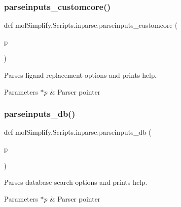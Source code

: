\subsubsection{\texorpdfstring{parseinputs\+\_\+customcore()}{parseinputs\_customcore()}}
{\footnotesize\ttfamily def mol\+Simplify.\+Scripts.\+inparse.\+parseinputs\+\_\+customcore (\begin{DoxyParamCaption}\item[{}]{p }\end{DoxyParamCaption})}



Parses ligand replacement options and prints help. 


\begin{DoxyParams}{Parameters}
{\em $\ast$p} & Parser pointer \\
\hline
\end{DoxyParams}
\mbox{\label{namespacemolSimplify_1_1Scripts_1_1inparse_a515dd3cb4232166cebbe466bf42ad916}} 
\subsubsection{\texorpdfstring{parseinputs\+\_\+db()}{parseinputs\_db()}}
{\footnotesize\ttfamily def mol\+Simplify.\+Scripts.\+inparse.\+parseinputs\+\_\+db (\begin{DoxyParamCaption}\item[{}]{p }\end{DoxyParamCaption})}



Parses database search options and prints help. 


\begin{DoxyParams}{Parameters}
{\em $\ast$p} & Parser pointer \\
\hline
\end{DoxyParams}
\mbox{\label{namespacemolSimplify_1_1Scripts_1_1inparse_a13962a825893d8d8a29d3b2197fb3203}} 
